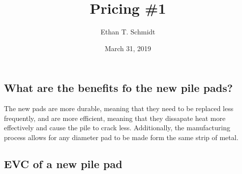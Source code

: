 \documentclass[]{article}
\title{Pricing \#1}
\author{Ethan T. Schmidt}
\date{March 31, 2019}
\begin{document}
\maketitle

{
\setcounter{tocdepth}{2}
\tableofcontents
}
\subsection{What are the benefits fo the new pile
pads?}\label{what-are-the-benefits-fo-the-new-pile-pads}

The new pads are more durable, meaning that they need to be replaced
less frequently, and are more efficient, meaning that they dissapate
heat more effectively and cause the pile to crack less. Additionally,
the manufacturing process allows for any diameter pad to be made form
the same strip of metal.

\subsection{EVC of a new pile pad}\label{evc-of-a-new-pile-pad}
\end{document}
